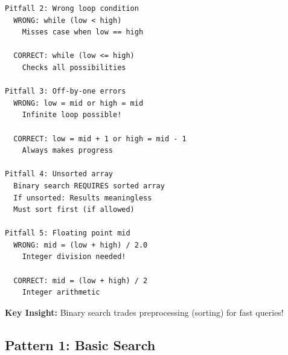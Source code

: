 \documentclass[11pt,a4paper,oneside]{book}
\begin{document}
\begin{tcolorbox}[
    enhanced,breakable,
    colback=white,
    colframe=deepblue,
    boxrule=1.5pt,
    arc=3mm,
    title=\textbf{The Divide and Conquer Paradigm}
]
\begin{verbatim}
Pitfall 2: Wrong loop condition
  WRONG: while (low < high)
    Misses case when low == high
  
  CORRECT: while (low <= high)
    Checks all possibilities

Pitfall 3: Off-by-one errors
  WRONG: low = mid or high = mid
    Infinite loop possible!
  
  CORRECT: low = mid + 1 or high = mid - 1
    Always makes progress

Pitfall 4: Unsorted array
  Binary search REQUIRES sorted array
  If unsorted: Results meaningless
  Must sort first (if allowed)

Pitfall 5: Floating point mid
  WRONG: mid = (low + high) / 2.0
    Integer division needed!
  
  CORRECT: mid = (low + high) / 2
    Integer arithmetic
\end{verbatim}

\textbf{Key Insight:}
Binary search trades preprocessing (sorting) for fast queries!
\end{tcolorbox}

\subsection{Pattern 1: Basic Search}
\end{document}
